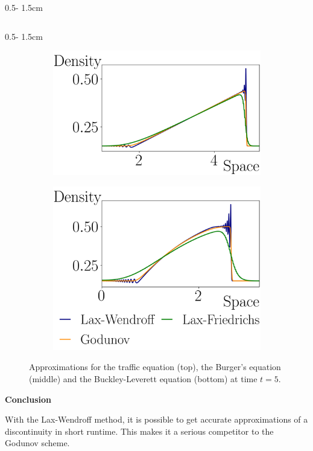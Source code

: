\documentclass{uibposter}
\begin{document}
\begin{frame}[fragile]
\begin{columns}
\begin{column}{0.5\textwidth - 1.5cm}
\begin{column}{0.5\textwidth - 1.5cm}
\begin{figure}
	\begin{subfigure}{\textwidth}
		\includegraphics{fig/burger_compare.png}
	\end{subfigure}

	\begin{subfigure}{\textwidth}
		\includegraphics{fig/buckley_compare.png}
	\end{subfigure}
	\caption{Approximations for the traffic equation (top), the Burger's equation (middle) and the Buckley-Leverett equation (bottom) at time $t = 5$.}
	\label{img:non_lin_equation}
\end{figure}

\textbf{Conclusion}

\vspace{0.5cm}
With the Lax-Wendroff method, it is possible to get accurate approximations of a discontinuity in short runtime. 
This makes it a serious competitor to the Godunov scheme.


\end{column}
\end{column}
\end{columns}
\end{frame}
\end{document}

